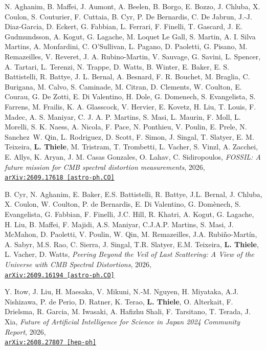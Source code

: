 \begin{minipage}{\textwidth}
N. Aghanim, B. Maffei, J. Aumont, A. Beelen, B. Borgo, E. Bozzo, J. Chluba, X. Coulon, S. Couturier, F. Cuttaia, B. Cyr, P. De Bernardis, C. De Jabrun, J.-J. Diaz-Garcia, D. Eckert, G. Fabbian, L. Ferrari, F. Finelli, T. Gascard, J. E. Gudmundsson, A. Kogut, G. Lagache, M. Loquet Le Gall, S. Martin, A. I. Silva Martins, A. Monfardini, C. O'Sullivan, L. Pagano, D. Paoletti, G. Pisano, M. Remazeilles, V. Reveret, J. A. Rubino-Martin, V. Sauvage, G. Savini, L. Spencer, A. Tartari, L. Terenzi, N. Trappe, D. Watts, B. Winter, E. Baker, E. S. Battistelli, R. Battye, J. L. Bernal, A. Besnard, F. R. Bouchet, M. Braglia, C. Burigana, M. Calvo, S. Caminade, M. Citran, D. Clements, W. Coulton, E. Courau, G. De Zotti, E. Di Valentino, H. Dole, G. Domenech, S. Evangelista, S. Farrens, M. Frailis, K. A. Glasscock, V. Hervier, E. Kovetz, H. Liu, T. Louis, F. Madec, A. S. Maniyar, C. J. A. P. Martins, S. Masi, L. Maurin, F. Moll, L. Morelli, S. K. Naess, A. Nicola, F. Pace, N. Ponthieu, V. Poulin, E. Prele, N. Sanchez\, W. Qin, L. Rodriguez, D. Scott, F. Simon, J. Singal, T. Slatyer, E. M. Teixeira, {\bf L. Thiele}, M. Tristram, T. Trombetti, L. Vacher, S. Vinzl, A. Zacchei, E. Allys, K. Aryan, J. M. Casas Gonzales, O. Lahav, C. Sidiropoulos,
\emph{FOSSIL: A future mission for CMB spectral distortion measurements}, 2026,\\
\href{https://arxiv.org/abs/2609.17618}{\mbox{\texttt{arXiv:2609.17618 [astro-ph.CO]}}}
\end{minipage}

\begin{minipage}{\textwidth}
  B. Cyr, N. Aghanim, E. Baker, E.S. Battistelli, R. Battye, J.L. Bernal, J. Chluba, X. Coulon, W. Coulton, P. de Bernardis, E. Di Valentino, G. Dom\`enech, S. Evangelista, G. Fabbian, F. Finelli, J.C. Hill, R. Khatri, A. Kogut, G. Lagache, H. Liu, B. Maffei, F. Majidi, A.S. Maniyar, C.J.A.P. Martins, S. Masi, J. McMahon, D. Paoletti, V. Poulin, W. Qin, M. Remazeilles, J.A. Rubi\~no-Mart\'in, A. Sabyr, M.S. Rao, C. Sierra, J. Singal, T.R. Slatyer, E.M. Teixeira, {\bf L. Thiele}, L. Vacher, D. Watts,
\emph{Peering Beyond the Veil of Last Scattering: A View of the Universe with CMB Spectral Distortions}, 2026,\\
\href{https://arxiv.org/abs/2609.16194}{\mbox{\texttt{arXiv:2609.16194 [astro-ph.CO]}}}
\end{minipage}

\begin{minipage}{\textwidth}
Y. Itow, J. Liu, H. Maesaka, V. Mikuni, N.-M. Nguyen, H. Miyataka, A.J. Nishizawa, P. de Perio, D. Ratner, K. Terao, {\bf L. Thiele}, O. Alterkait, F. Drielsma, R. Garcia, M. Iwasaki, A. Hafizhu Shali, F. Tarsitano, T. Terada, J. Xia,
\emph{Future of Artificial Intelligence for Science in Japan 2024 Community Report}, 2026,\\
\href{https://arxiv.org/abs/2608.27807}{\mbox{\texttt{arXiv:2608.27807 [hep-ph]}}}
\end{minipage}

